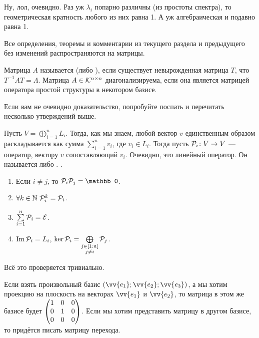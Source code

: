 \documentclass{article}
\let\vec\vv
\DeclareMathOperator{\operIm}{Im}
\let\Im\operIm
\newcommand*{\id}{{\scriptE}}
\begin{document}
\begin{itemize}
\begin{Proof}
            Ну, лол, очевидно. Раз уж $\lambda_i$ попарно различны (из простоты спектра), то геометрическая кратность любого из них равна 1. А уж алгебраическая и подавно равна 1.
        \end{Proof}
        \begin{Comment}
            Все определения, теоремы и комментарии из текущего раздела и предыдущего без изменений распространяются на матрицы.
        \end{Comment}
        \dfn Матрица $A$ называется  (либо ), если существует невырожденная матрица $T$, что $T^{-1}AT=\Lambda$.
        \thm Матрица $A\in{\mathcal{K}}^{n\times n}$ диагонализируема, если она является матрицей оператора простой структуры в некотором базисе.
        \begin{Proof}
            Если вам не очевидно доказательство, попробуйте поспать и перечитать несколько утверждений выше.
        \end{Proof}
        \dfn Пусть $V=\bigoplus\limits_{i=1}^n L_i$. Тогда, как мы знаем, любой вектор $v$ единственным образом раскладывается как сумма $\sum\limits_{i=1}^nv_i$, где $v_i\in L_i$. Тогда пусть ${\mathcal{P}}_i\colon V\to V$ --- оператор, вектору $v$ сопоставляющий $v_i$. Очевидно, это линейный оператор. Он называется  либо .
        \thm {}.
        \begin{enumerate}
            \item Если $i\neq j$, то $\scriptP_i\scriptP_j=\mathbb0$.
            \item $\forall k\in\mathbb N~{\mathcal{P}}_i^k={\mathcal{P}}_i$.
            \item $\sum\limits_{i=1}^n\scriptP_i=\id$.
            \item $\Im\scriptP_i=L_i$, $\ker{\mathcal{P}}_i=\bigoplus\limits_{\substack{j\in[1:n]\\j\neq i}}{\mathcal{P}}_j$.
        \end{enumerate}
        \begin{Proof}
            Всё это проверяется тривиально.
        \end{Proof}
        \begin{Example}
            Если взять произвольный базис $(\vec{e_1};\vec{e_2};\vec{e_3})$, а мы хотим проекцию на плоскость на векторах $\vec{e_1}$ и $\vec{e_2}$, то матрица в этом же базисе будет $\left(\begin{matrix}1 & 0 & 0\\0 & 1 & 0\\0 & 0 & 0\end{matrix}\right)$. Если мы хотим представить матрицу в другом базисе, то придётся писать матрицу перехода.

\end{Example}
\end{itemize}
\end{document}
